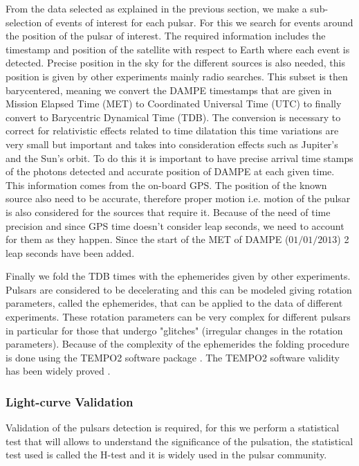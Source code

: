 \documentclass{PoS}
\begin{document}
From the data selected as explained in the previous section, we make a sub-selection of events of interest for each pulsar. For this we search for events around the position of the pulsar of interest. The required information includes the timestamp and position of the satellite with respect to Earth where each event is detected. Precise position in the sky for the different sources is also needed, this position is given by other experiments mainly radio searches.
This subset is then barycentered, meaning we convert the DAMPE timestamps that are given in Mission Elapsed Time (MET) to Coordinated Universal Time (UTC) to finally convert to Barycentric Dynamical Time (TDB). The conversion is necessary to correct for relativistic effects related  to  time dilatation this time variations are very small but important and takes into consideration effects such as Jupiter's and the Sun's orbit. To do this it is important  to have precise arrival time stamps of the photons detected and accurate position of DAMPE at each given time. This information comes from the on-board GPS.  The position of the known source also need to be accurate, therefore proper motion i.e. motion of the pulsar is also considered for the sources that require it. Because of the need of time precision and since GPS time doesn't consider leap seconds, we need to account for them as they happen. Since the start of the MET of DAMPE ($01/01/2013$) 2 leap seconds have been added.

Finally we  fold the TDB times with the ephemerides given by other experiments. Pulsars are considered to be decelerating and this can be modeled giving rotation parameters, called the ephemerides, that can be applied to the data of different experiments. These rotation parameters can be very complex for different  pulsars in particular for those that undergo "glitches" (irregular changes in the rotation parameters). Because of the complexity of the ephemerides the folding procedure is done using the TEMPO2 software package \cite{tempo2}. The TEMPO2 software validity has been widely proved \cite{2catalogfermi} \cite{geminga_fermi}. 



\subsubsection{Light-curve Validation}
Validation of the pulsars detection is required, for this we perform a statistical test that will  allows to understand the significance of  the pulsation, the statistical test used is called the H-test and it is widely used in the pulsar community.
\end{document}
